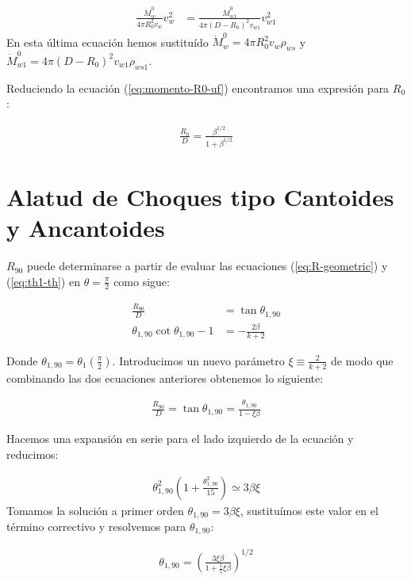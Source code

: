 \begin{align}
  \frac{\dot{M}^0_w}{4\pi R_0^2 v_w}v^2_w &= \frac{\dot{M}^0_{w1}}{4\pi\left(D-R_0\right)^2v_{w1}}v^2_{w1} \label{eq:momento-R0-uf}
\end{align}
En esta última ecuación hemos sustituído $\dot{M}^0_w = 4\pi R_0^2 v_w \rho_{ws}$ y \\
$\dot{M}^0_{w1} = 4\pi \left(D - R_0\right)^2 v_{w1} \rho_{ws1}$.

Reduciendo la ecuación (\ref{eq:momento-R0-uf}) encontramos una expresión para $R_0$:

\begin{align}
  \frac{R_0}{D} = \frac{\beta^{1/2}}{1+\beta^{1/2}}
\end{align}

\section[Alatud]{Alatud de Choques tipo Cantoides y Ancantoides}
\label{app:alatude-derivation}
$R_{90}$ puede determinarse a partir de evaluar las ecuaciones (\ref{eq:R-geometric}) y (\ref{eq:th1-th}) en $\theta=\frac{\pi}{2}$
como sigue:

\begin{align}
  \frac{R_{90}}{D} &= \tan\theta_{1,90} \\
  \theta_{1,90}\cot\theta_{1,90} -1 &=  - \frac{2\beta}{k+2}
\end{align}

Donde $\theta_{1,90} = \theta_1\left(\frac{\pi}{2}\right)$. Introducimos un nuevo parámetro $\xi \equiv \frac{2}{k+2}$ de modo que
combinando las dos ecuaciones anteriores obtenemos lo siguiente:

\begin{align}
  \frac{R_{90}}{D} = \tan\theta_{1,90} = \frac{\theta_{1,90}}{1-\xi\beta} \label{eq:r90-incomplete}
\end{align}

Hacemos una expansión en serie para el lado izquierdo de la ecuación y reducimos:

\begin{align}
  \theta^2_{1,90}\left(1 + \frac{\theta^2_{1,90}}{15}\right) \simeq 3\beta\xi
\end{align}
Tomamos la solución a primer orden $\theta_{1,90} = 3\beta\xi$,  sustituímos este valor en el término correctivo y resolvemos para
$\theta_{1,90}$:

\begin{align}
  \theta_{1,90} = \left(\frac{3\xi\beta}{1+\frac{1}{5}\xi\beta}\right)^{1/2} \label{eq:th190}
\end{align}

